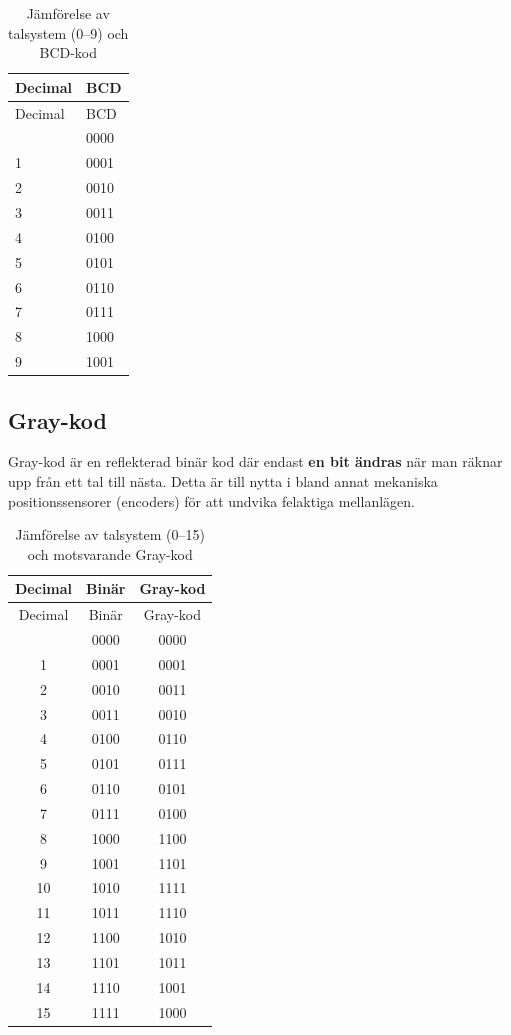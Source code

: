 \documentclass[
  swedish,
  letterpaper,
  oneside,
  openany]{book}
\begin{document}
\begin{longtable}[]{@{}ll@{}}
\caption{Jämförelse av talsystem (0--9) och
BCD-kod}\label{tbl-ascii}\tabularnewline
\toprule\noalign{}
Decimal & BCD \\
\midrule\noalign{}
\endfirsthead
\toprule\noalign{}
Decimal & BCD \\
\midrule\noalign{}
\endhead
\bottomrule\noalign{}
\endlastfoot
0 & 0000 \\
1 & 0001 \\
2 & 0010 \\
3 & 0011 \\
4 & 0100 \\
5 & 0101 \\
6 & 0110 \\
7 & 0111 \\
8 & 1000 \\
9 & 1001 \\
\end{longtable}

\subsection{Gray-kod}\label{gray-kod}

Gray-kod är en reflekterad binär kod där endast \textbf{en bit ändras}
när man räknar upp från ett tal till nästa. Detta är till nytta i bland
annat mekaniska positionssensorer (encoders) för att undvika felaktiga
mellanlägen.

\begin{longtable}[]{@{}ccc@{}}
\caption{Jämförelse av talsystem (0--15) och motsvarande
Gray-kod}\label{tbl-graykod}\tabularnewline
\toprule\noalign{}
Decimal & Binär & Gray-kod \\
\midrule\noalign{}
\endfirsthead
\toprule\noalign{}
Decimal & Binär & Gray-kod \\
\midrule\noalign{}
\endhead
\bottomrule\noalign{}
\endlastfoot
0 & 0000 & 0000 \\
1 & 0001 & 0001 \\
2 & 0010 & 0011 \\
3 & 0011 & 0010 \\
4 & 0100 & 0110 \\
5 & 0101 & 0111 \\
6 & 0110 & 0101 \\
7 & 0111 & 0100 \\
8 & 1000 & 1100 \\
9 & 1001 & 1101 \\
10 & 1010 & 1111 \\
11 & 1011 & 1110 \\
12 & 1100 & 1010 \\
13 & 1101 & 1011 \\
14 & 1110 & 1001 \\
15 & 1111 & 1000 \\
\end{longtable}
\end{document}
